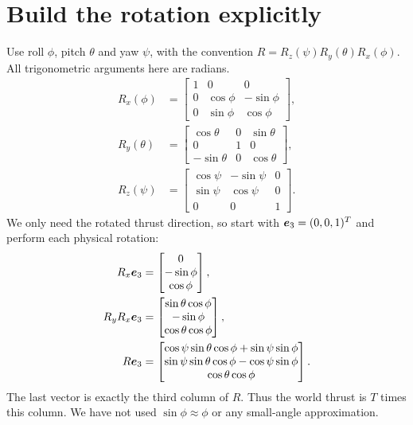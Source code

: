 \section{Build the rotation explicitly}
Use roll $\phi$, pitch $\theta$ and yaw $\psi$, with the convention
$R=R_z(\psi)R_y(\theta)R_x(\phi)$. All trigonometric arguments here are radians.
\begin{align}
R_x(\phi)&=\begin{bmatrix}1&0&0\\0&\cos\phi&-\sin\phi\\0&\sin\phi&\cos\phi\end{bmatrix},\\
R_y(\theta)&=\begin{bmatrix}\cos\theta&0&\sin\theta\\0&1&0\\-\sin\theta&0&\cos\theta\end{bmatrix},\\
R_z(\psi)&=\begin{bmatrix}\cos\psi&-\sin\psi&0\\\sin\psi&\cos\psi&0\\0&0&1\end{bmatrix}.
\end{align}
We only need the rotated thrust direction, so start with
$\bm{e}_3=(0,0,1)^T$ and perform each physical rotation:
\begin{align}
R_x\bm{e}_3&=\begin{bmatrix}0\\-\sin\phi\\\cos\phi\end{bmatrix},\\
R_yR_x\bm{e}_3&=\begin{bmatrix}\sin\theta\cos\phi\\-\sin\phi\\\cos\theta\cos\phi\end{bmatrix},\\
R\bm{e}_3&=\begin{bmatrix}
\cos\psi\sin\theta\cos\phi+\sin\psi\sin\phi\\
\sin\psi\sin\theta\cos\phi-\cos\psi\sin\phi\\
\cos\theta\cos\phi
\end{bmatrix}.
\end{align}
The last vector is exactly the third column of $R$. Thus the world thrust is
$T$ times this column. We have not used $\sin\phi\approx\phi$ or any small-angle
approximation.

